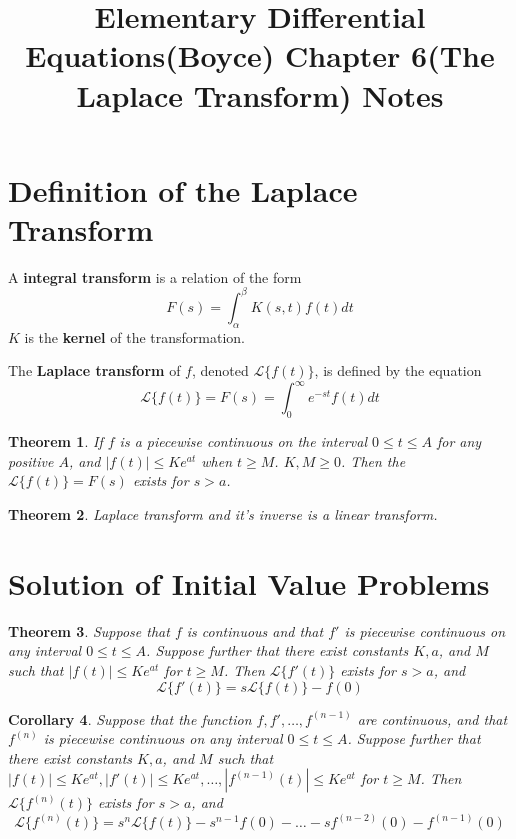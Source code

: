 \documentclass[letter]{article}
\title{Elementary Differential Equations(Boyce) Chapter 6(The Laplace Transform) Notes}
\date{}
\newcommand{\laplace}[1]{\mathscr{L}\{#1\}}
\newtheorem{theorem}{Theorem}[section]
\newtheorem{corollary}[theorem]{Corollary}
\newenvironment{definition}[1][Definition]{\begin{trivlist}
\item[\hskip \labelsep {\bfseries #1}]}{\end{trivlist}}
\begin{document}
\maketitle
\vspace{-.5in}
\section{Definition of the Laplace Transform}
\begin{definition}
A \textbf{integral transform} is a relation of the form 
\[
F(s) = \int_\alpha^\beta K(s,t) f(t) dt
\]
$K$ is the \textbf{kernel} of the transformation.
\end{definition}

\begin{definition}
The \textbf{Laplace transform} of $f$, denoted $\laplace{f(t)}$, is defined by the equation
\[
\laplace{f(t)} = F(s) = \int_0^\infty e^{-st} f(t) dt
\]
\end{definition}

\begin{theorem}
If $f$ is a piecewise continuous on the interval $0\leq t \leq A$ for any positive $A$, and $|f(t)| \leq Ke^{at}$ when $t\geq M$. $K,M\geq 0$. Then the $\laplace{f(t)}  = F(s)$ exists for $s > a$.
\end{theorem}

\begin{theorem}
Laplace transform and it's inverse is a linear transform.
\end{theorem}

\section{Solution of Initial Value Problems}
\begin{theorem}
Suppose that $f$ is continuous and that $f'$ is piecewise continuous on any interval $0\leq t \leq A$. Suppose further that there exist constants $K, a$, and $M$ such that $|f(t)| \leq Ke^{at}$ for $t\geq M$. Then $\laplace{f'(t)}$ exists for $s>a$, and
\[
\laplace{f'(t)} = s \laplace{f(t)} - f(0)
\]
\end{theorem}

\begin{corollary}
Suppose that the function $f, f', \ldots, f^{(n-1)}$ are continuous, and that $f^{(n)}$ is piecewise continuous on any interval $0\leq t \leq A$.  Suppose further that there exist constants $K, a$, and $M$ such that $|f(t)| \leq Ke^{at},|f'(t)| \leq Ke^{at},\ldots,|f^{(n-1)}(t)| \leq Ke^{at}$ for $t\geq M$. Then $\laplace{f^{(n)}(t)}$ exists for $s>a$, and
\[
\laplace{f^{(n)}(t)} = s^n \laplace{f(t)} - s^{n-1} f(0) - \ldots -  s f^{(n-2)}(0) - f^{(n-1)}(0)
\]
\end{corollary}
\end{document}
